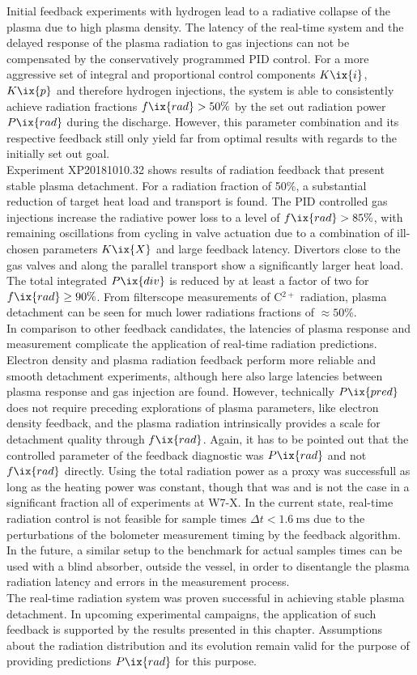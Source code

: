         Initial feedback experiments with hydrogen lead to a radiative collapse of the plasma due to high plasma density. The latency of the real-time system and the delayed response of the plasma radiation to gas injections can not be compensated by the conservatively programmed PID control. For a more aggressive set of integral and proportional control components $K\ix{i}$, $K\ix{p}$ and therefore hydrogen injections, the system is able to consistently achieve radiation fractions $f\ix{rad}>50\%$ by the set out radiation power $P\ix{rad}$ during the discharge. However, this parameter combination and its respective feedback still only yield far from optimal results with regards to the initially set out goal.\\%
        Experiment XP20181010.32 shows results of radiation feedback that present stable plasma detachment. For a radiation fraction of 50\%, a substantial reduction of target heat load and transport is found. The PID controlled gas injections increase the radiative power loss to a level of $f\ix{rad}>85\%$, with remaining oscillations from cycling in valve actuation due to a combination of ill-chosen parameters $K\ix{X}$ and large feedback latency. Divertors close to the gas valves and along the parallel transport show a significantly larger heat load. The total integrated $P\ix{div}$ is reduced by at least a factor of two for $f\ix{rad}\ge90\%$. From filterscope measurements of C$^{2+}$ radiation, plasma detachment can be seen for much lower radiations fractions of $\approx50\%$.\\%
        In comparison to other feedback candidates, the latencies of plasma response and measurement complicate the application of real-time radiation predictions. Electron density and plasma radiation feedback perform more reliable and smooth detachment experiments, although here also large latencies between plasma response and gas injection are found. However, technically $P\ix{pred}$ does not require preceding explorations of plasma parameters, like electron density feedback, and the plasma radiation intrinsically provides a scale for detachment quality through $f\ix{rad}$. Again, it has to be pointed out that the controlled parameter of the feedback diagnostic was $P\ix{rad}$ and not $f\ix{rad}$ directly. Using the total radiation power as a proxy was successfull as long as the heating power was constant, though that was and is not the case in a significant fraction all of experiments at W7-X. In the current state, real-time radiation control is not feasible for sample times $\Delta t<\SI{1.6}{\milli\second}$ due to the perturbations of the bolometer measurement timing by the feedback algorithm. In the future, a similar setup to the benchmark for actual samples times can be used with a blind absorber, outside the vessel, in order to disentangle the plasma radiation latency and errors in the measurement process.\\%
        The real-time radiation system was proven successful in achieving stable plasma detachment. In upcoming experimental campaigns, the application of such feedback is supported by the results presented in this chapter. Assumptions about the radiation distribution and its evolution remain valid for the purpose of providing predictions $P\ix{rad}$ for this purpose.%
%